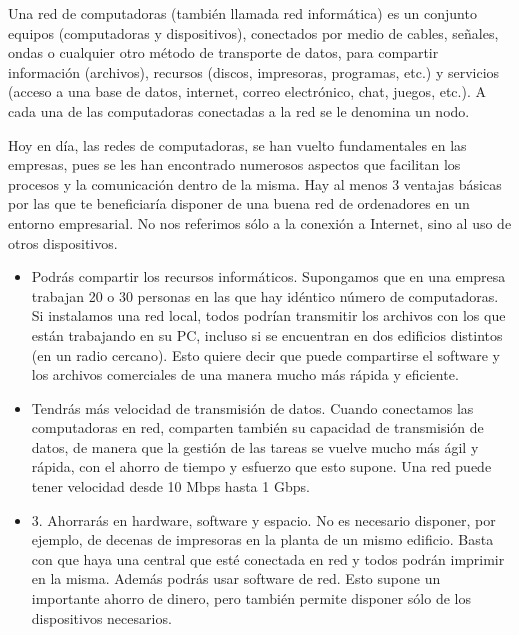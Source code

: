 \noindent
Una red de computadoras (también llamada red informática) es un conjunto equipos (computadoras y dispositivos), conectados por medio de cables, señales, ondas o cualquier otro método de transporte de datos, para compartir información (archivos), recursos (discos, impresoras, programas, etc.) y servicios (acceso a una base de datos, internet, correo electrónico, chat, juegos, etc.). A
cada una de las computadoras conectadas a la red se le denomina un nodo. \cite{def_redComputadoras}

\noindent
\newline
Hoy en día, las redes de computadoras, se han vuelto fundamentales en las empresas, pues se les han encontrado numerosos aspectos que facilitan los procesos y la comunicación dentro de la misma. 
\newline
Hay al menos 3 ventajas básicas por las que te beneficiaría disponer de una buena red de ordenadores en un entorno empresarial. No nos referimos sólo a la conexión a Internet, sino al uso de otros dispositivos.
\begin{itemize}
	\item Podrás compartir los recursos informáticos. Supongamos que en una empresa trabajan 20 o 30 personas en las que hay idéntico número de computadoras. Si instalamos una red local, todos podrían transmitir los archivos con los que están trabajando en su PC, incluso si se encuentran en dos edificios distintos (en un radio cercano). Esto quiere decir que puede compartirse el software y los archivos comerciales de una manera mucho más rápida y eficiente.
	\item Tendrás más velocidad de transmisión de datos. Cuando conectamos las computadoras en red, comparten también su capacidad de transmisión de datos, de manera que la gestión de las tareas se vuelve mucho más ágil y rápida, con el ahorro de tiempo y esfuerzo que esto supone. Una red puede tener velocidad desde 10 Mbps hasta 1 Gbps.
	\item 3. Ahorrarás en hardware, software y espacio. No es necesario disponer, por ejemplo, de decenas de impresoras en la planta de un mismo edificio. Basta con que haya una central que esté conectada en red y todos podrán imprimir en la misma. Además podrás usar software de red. Esto supone un importante ahorro de dinero, pero también permite disponer sólo de los dispositivos necesarios. \cite{ventajas_redEmpresa}
\end{itemize}

